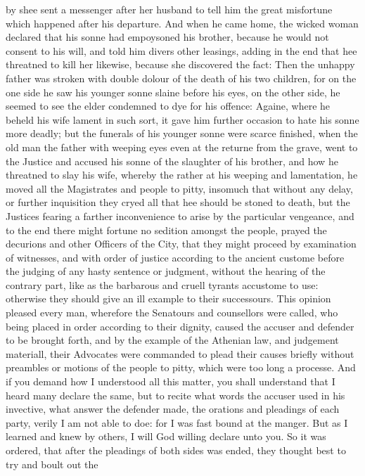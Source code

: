by shee sent a messenger after her husband to tell him the great misfortune
which happened after his departure. And when he came home, the wicked woman
declared that his sonne had empoysoned his brother, because he would not
consent to his will, and told him divers other leasings, adding in the end that
hee threatned to kill her likewise, because she discovered the fact: Then the
unhappy father was stroken with double dolour of the death of his two children,
for on the one side he saw his younger sonne slaine before his eyes, on the
other side, he seemed to see the elder condemned to dye for his offence:
Againe, where he beheld his wife lament in such sort, it gave him further
occasion to hate his sonne more deadly; but the funerals of his younger sonne
were scarce finished, when the old man the father with weeping eyes even at the
returne from the grave, went to the Justice and accused his sonne of the
slaughter of his brother, and how he threatned to slay his wife, whereby the
rather at his weeping and lamentation, he moved all the Magistrates and people
to pitty, insomuch that without any delay, or further inquisition they cryed
all that hee should be stoned to death, but the Justices fearing a farther
inconvenience to arise by the particular vengeance, and to the end there might
fortune no sedition amongst the people, prayed the decurions and other Officers
of the City, that they might proceed by examination of witnesses, and with
order of justice according to the ancient custome before the judging of any
hasty sentence or judgment, without the hearing of the contrary part, like as
the barbarous and cruell tyrants accustome to use: otherwise they should give
an ill example to their successours. This opinion pleased every man, wherefore
the Senatours and counsellors were called, who being placed in order according
to their dignity, caused the accuser and defender to be brought forth, and by
the example of the Athenian law, and judgement materiall, their Advocates were
commanded to plead their causes briefly without preambles or motions of the
people to pitty, which were too long a processe. And if you demand how I
understood all this matter, you shall understand that I heard many declare the
same, but to recite what words the accuser used in his invective, what answer
the defender made, the orations and pleadings of each party, verily I am not
able to doe: for I was fast bound at the manger. But as I learned and knew by
others, I will God willing declare unto you. So it was ordered, that after the
pleadings of both sides was ended, they thought best to try and boult out the
